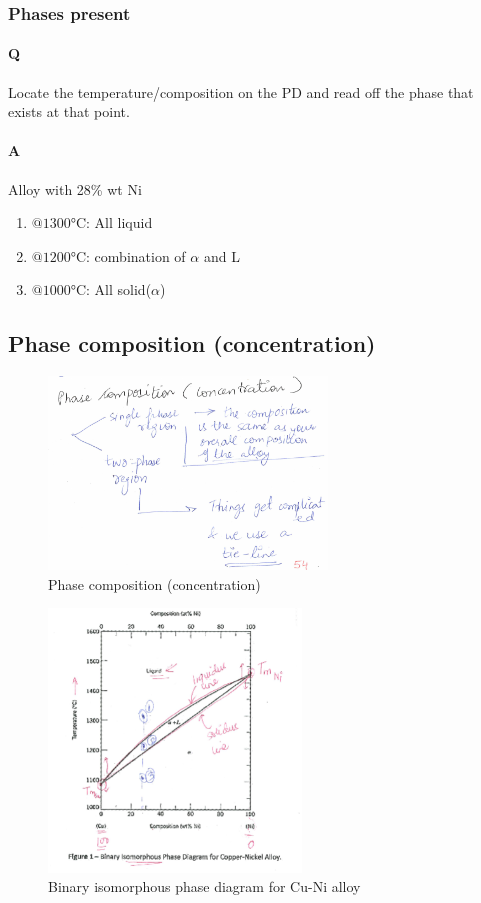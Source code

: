 \documentclass{article}
\begin{document}
\subsubsection{Phases present}

\paragraph{Q} Locate the temperature/composition on the PD and read off the phase that exists at that point.

\paragraph{A} Alloy with 28\% wt Ni 

\begin{enumerate}
    \item $@1300\si\celsius$: All liquid
    \item $@1200\si\celsius$: combination of $\alpha$ and L
    \item $@1000\si\celsius$: All solid($\alpha$)
\end{enumerate}

\subsection{Phase composition (concentration)}

\begin{figure}[H]
	\centering
	\includegraphics[width=0.66\textwidth]{assets/759b1bb4.png}
	\caption{Phase composition (concentration)}
\end{figure}

\begin{figure}[h!]
	\centering
	\includegraphics[width=0.60\textwidth]{assets/aad184f6.png}
	\caption{Binary isomorphous phase diagram for Cu-Ni alloy}
\end{figure}
\end{document}
